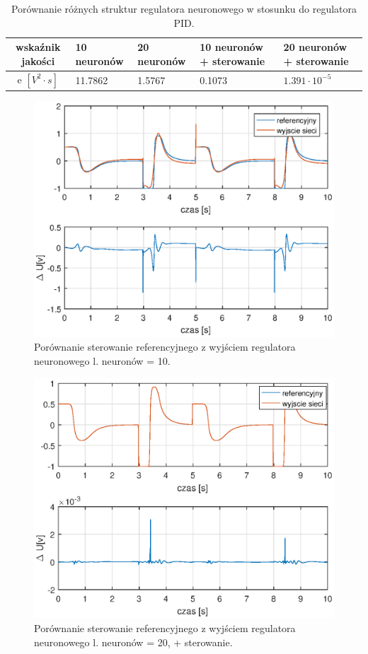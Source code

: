 	\begin{table}[h]
		\caption{Porównanie różnych struktur regulatora neuronowego w stosunku do regulatora PID.}
		\label{optNeural}
		\centering
		
		\begin{tabular}{|c|M{2.5cm}|M{2.5cm}|M{2.5cm}|M{2.5cm}|}
			\hline
			wska\'znik jakości&10 neuronów&20 neuronów&10 neuronów + sterowanie&20 neuronów + sterowanie\\
			\hline
			e $[V^2 \cdot s]$&11.7862 &   1.5767 &   0.1073& $1.391 \cdot 10^{-5}$ \\
			\hline
		\end{tabular}
	\end{table}
	
	
	\begin{figure}[h!]
		\centering
		\includegraphics[scale = 0.8]{fig/10neuron.eps}
		\caption		
		{Porównanie sterowanie referencyjnego z wyjściem regulatora neuronowego l. neuronów = 10.}
		\label{10n}
	\end{figure}

\begin{figure}[h!]
	\centering
	\includegraphics[scale = 0.8]{fig/20neuronU.eps}
	\caption		
	{Porównanie sterowanie referencyjnego z wyjściem regulatora neuronowego l. neuronów = 20, + sterowanie.}
	\label{20nU}
\end{figure}

\FloatBarrier
\newpage